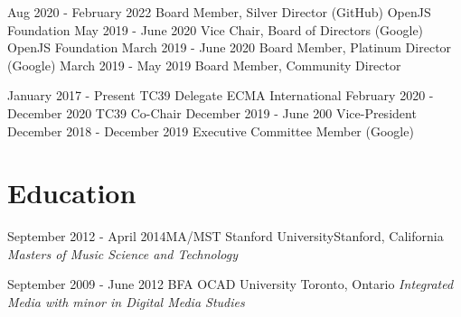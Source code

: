 \documentclass[10pt,a4paper,sans]{moderncv}   %
\begin{document}
\cventry
  {Aug 2020 - February 2022}
  {Board Member, Silver Director (GitHub)}
  {OpenJS Foundation}
  {}{}{}
\cventry
  {May 2019 - June 2020}
  {Vice Chair, Board of Directors (Google)}
  {OpenJS Foundation}
  {}{}{}
\cventry
  {March 2019 - June 2020}
  {Board Member, Platinum Director (Google)}
  {}
  {}{}{}
\cventry
  {March 2019 - May 2019}
  {Board Member, Community Director}
  {}
  {}{}{}


\cventry
  {January 2017 - Present}
  {TC39 Delegate}
  {ECMA International}
  {}{}{}
\cventry
  {February 2020 - December 2020}
  {TC39 Co-Chair}
  {}
  {}{}{}
\cventry
  {December 2019 - June 200}
  {Vice-President}
  {}
  {}{}{}
\cventry
  {December 2018 - December 2019}
  {Executive Committee Member (Google)}
  {}
  {}{}{}


\section{Education}

\cventry
  {September 2012 - April 2014}{MA/MST}
  {Stanford University}{Stanford, California}
  {\textit{Masters of Music Science and Technology}}
  {}

\cventry
  {September 2009 - June 2012}
  {BFA}
  {OCAD University}
  {Toronto, Ontario}
  {\textit{Integrated Media with minor in Digital Media Studies}}
  {}
\end{document}
